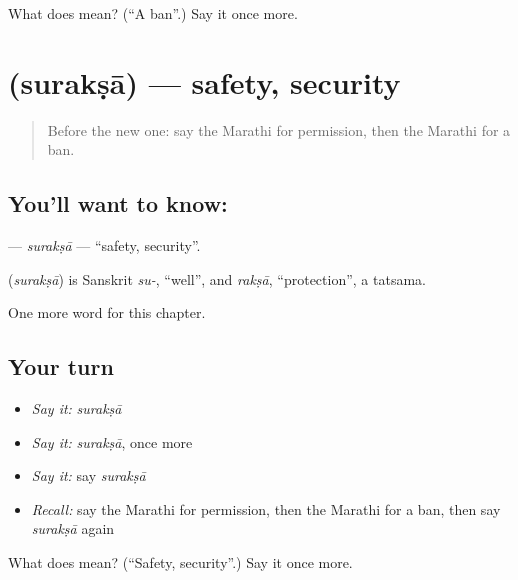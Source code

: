 \begin{tcolorbox}[breakable,colback=teal!4,colframe=teal!35!black,title={Before you move on}]
What does  mean? (\textquotedblleft{}A ban\textquotedblright{}.) Say it once more.
\end{tcolorbox}
\section[\texorpdfstring{\mr{सुरक्षा} (surakṣā)}{सुरक्षा (surakṣā)}]{ (surakṣā) — safety, security}

\label{lesson:MR-C265-suraksa}



\begin{quote}
Before the new one: say the Marathi for permission, then the Marathi for a ban.
\end{quote}

\subsection*{You'll want to know: }
\textbf{} — \emph{surakṣā} — \textquotedblleft{}safety, security\textquotedblright{}.

\begin{cousinweb}
\textbf{} (\emph{surakṣā}) is Sanskrit \emph{su-}, \textquotedblleft{}well\textquotedblright{}, and \emph{rakṣā}, \textquotedblleft{}protection\textquotedblright{}, a tatsama.
\end{cousinweb}

\begin{grammarlens}[title={What you've built}]
One more word for this chapter.
\end{grammarlens}

\subsection*{Your turn}
\begin{itemize}
\raggedright
  \item \emph{Say it:} \emph{surakṣā}
  \item \emph{Say it:} \emph{surakṣā}, once more
  \item \emph{Say it:} say \emph{surakṣā}
  \item \emph{Recall:} say the Marathi for permission, then the Marathi for a ban, then say \emph{surakṣā} again
\end{itemize}

\begin{tcolorbox}[breakable,colback=teal!4,colframe=teal!35!black,title={Before you move on}]
What does  mean? (\textquotedblleft{}Safety, security\textquotedblright{}.) Say it once more.
\end{tcolorbox}
